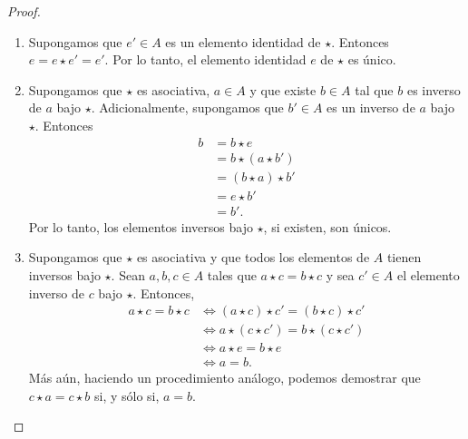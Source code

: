 \documentclass[notasLineal]{subfiles}
\begin{document}
\begin{proof}\leavevmode
    
    \begin{enumerate}[label=(\alph*)]

        \item Supongamos que $e'\in A$ es un elemento identidad de $\star$. Entonces $e=e\star e'=e'$. Por lo tanto, el elemento identidad $e$ de $\star$ es único.

        \item Supongamos que $\star$ es asociativa, $a\in A$ y que existe $b\in A$ tal que $b$ es inverso de $a$ bajo $\star$. Adicionalmente, supongamos que $b'\in A$ es un inverso de $a$ bajo $\star$. Entonces
            \begin{align*}
                b &= b\star e \tag{$e$ es neutro} \\
                  &= b\star (a\star b') \tag{$b'$ es inverso de $a$} \\
                  &= (b\star a)\star b' \tag{$\star$ es asociativa} \\
                  &= e\star b' \tag{$b$ es inverso de $a$} \\
                  &= b'.
            \end{align*}
            Por lo tanto, los elementos inversos bajo $\star$, si existen, son únicos.

        \item Supongamos que $\star$ es asociativa y que todos los elementos de $A$ tienen inversos bajo $\star$. Sean $a,b,c\in A$ tales que $a\star c=b\star c$ y sea $c'\in A$ el elemento inverso de $c$ bajo $\star$. Entonces,
            \begin{align*}
                a\star c=b\star c &\iff (a\star c)\star c' = (b\star c)\star c' \\
                                  &\iff a\star(c\star c') = b\star(c\star c') \\
                                  &\iff a\star e = b\star e \\
                                  &\iff a = b.
            \end{align*}
            Más aún, haciendo un procedimiento análogo, podemos demostrar que $c\star a=c\star b$ si, y sólo si, $a=b$.
    \end{enumerate}
\end{proof}

\end{document}

